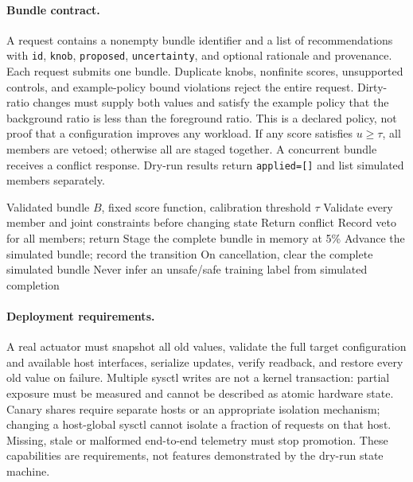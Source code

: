 \paragraph{Bundle contract.}
A request contains a nonempty bundle identifier and a list of recommendations with \texttt{id}, \texttt{knob}, \texttt{proposed}, \texttt{uncertainty}, and optional rationale and provenance. Each request submits one bundle. Duplicate knobs, nonfinite scores, unsupported controls, and example-policy bound violations reject the entire request. Dirty-ratio changes must supply both values and satisfy the example policy that the background ratio is less than the foreground ratio. This is a declared policy, not proof that a configuration improves any workload. If any score satisfies $u\ge\tau$, all members are vetoed; otherwise all are staged together. A concurrent bundle receives a conflict response. Dry-run results return \texttt{applied=[]} and list simulated members separately.

\begin{algorithm}[t]
\caption{Implemented dry-run bundle path}
\label{alg:control-loop}
\begin{algorithmic}[1]
\REQUIRE Validated bundle $B$, fixed score function, calibration threshold $\tau$
\STATE Validate every member and joint constraints before changing state
  \STATE Return conflict
\ENDIF
{}
  \STATE Record veto for all members; return
\ENDIF
\STATE Stage the complete bundle in memory at 5\%
  \STATE Advance the simulated bundle; record the transition
\ENDFOR
\STATE On cancellation, clear the complete simulated bundle
\STATE Never infer an unsafe/safe training label from simulated completion
\end{algorithmic}
\end{algorithm}

\paragraph{Deployment requirements.}
A real actuator must snapshot all old values, validate the full target configuration and available host interfaces, serialize updates, verify readback, and restore every old value on failure. Multiple sysctl writes are not a kernel transaction: partial exposure must be measured and cannot be described as atomic hardware state. Canary shares require separate hosts or an appropriate isolation mechanism; changing a host-global sysctl cannot isolate a fraction of requests on that host. Missing, stale or malformed end-to-end telemetry must stop promotion. These capabilities are requirements, not features demonstrated by the dry-run state machine.

